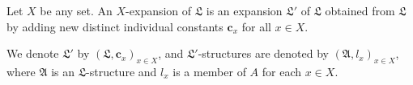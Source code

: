 Let $X$ be any set. An $X$-expansion of $\mathfrak{L}$ is an expansion $\mathfrak{L}'$ of $\mathfrak{L}$ obtained from $\mathfrak{L}$ by adding new distinct individual constants $\mathbf{c}_x$ for all $x \in X$.

We denote $\mathfrak{L}'$ by $(\mathfrak{L}, \mathbf{c}_x)_{x \in X}$, and $\mathfrak{L}'$-structures are denoted by $(\mathfrak{A}, l_x)_{x \in X}$, where $\mathfrak{A}$ is an $\mathfrak{L}$-structure and $l_x$ is a member of $A$ for each $x \in X$.


